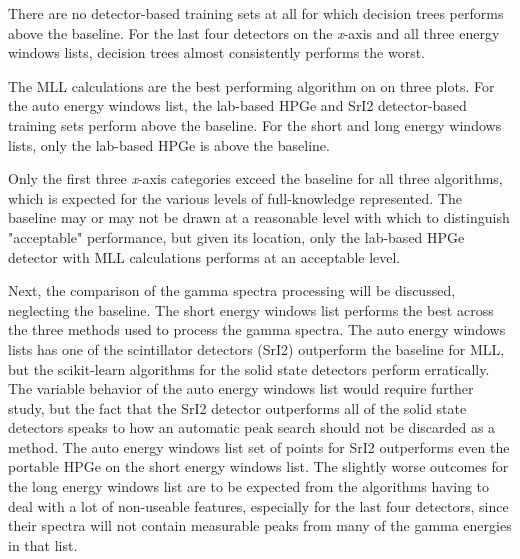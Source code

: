 There are no detector-based training sets at all for which decision trees
performs above the baseline. For the last four detectors on the \textit{x}-axis
and all three energy windows lists, decision trees almost consistently performs
the worst. 

The \gls{MLL} calculations are the best performing algorithm on on three plots.
For the auto energy windows list, the lab-based \gls{HPGe} and \gls{SrI2}
detector-based training sets perform above the baseline. For the short and long
energy windows lists, only the lab-based \gls{HPGe} is above the baseline. 

Only the first three \textit{x}-axis categories exceed the baseline for all
three algorithms, which is expected for the various levels of full-knowledge
represented. The baseline may or may not be drawn at a reasonable level with
which to distinguish "acceptable" performance, but given its location, only the
lab-based \gls{HPGe} detector with \gls{MLL} calculations performs at an
acceptable level.

Next, the comparison of the gamma spectra processing will be discussed,
neglecting the baseline.  The short energy windows list performs the best
across the three methods used to process the gamma spectra. The auto energy
windows lists has one of the scintillator detectors (\gls{SrI2}) outperform the
baseline for \gls{MLL}, but the scikit-learn algorithms for the solid state
detectors perform erratically.  The variable behavior of the auto energy
windows list would require further study, but the fact that the \gls{SrI2}
detector outperforms all of the solid state detectors speaks to how an
automatic peak search should not be discarded as a method.  The auto energy
windows list set of points for \gls{SrI2} outperforms even the portable
\gls{HPGe} on the short energy windows list.  The slightly worse outcomes for
the long energy windows list are to be expected from the algorithms having to
deal with a lot of non-useable features, 
especially for the last four detectors, since their spectra will not contain
measurable peaks from many of the gamma energies in that list. 


